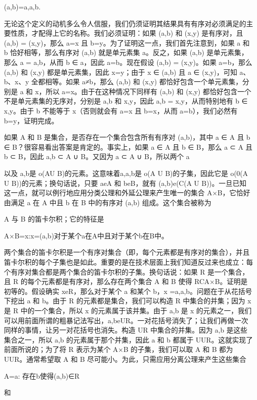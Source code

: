 \documentclass[12pt,a4paper]{ctexbook}
\theoremstyle{definition}
\theoremstyle{remark}
\begin{document}
(a,b)={{a},{a,b}}.

无论这个定义的动机多么令人信服，我们仍须证明其结果具有有序对必须满足的主要性质，才配得上它的名称。我们必须证明：如果 (a,b) 和 (x,y) 是有序对，且 (a,b) = (x,y)，那么 a=x 且 b=y。为了证明这一点，我们首先注意到，如果 a 和 b 恰好相等，那么有序对 (a,b) 就是单元素集 {{a}}。反之，如果 (a,b) 是单元素集，那么 {a} = {a,b}，从而 b ∈ {a}，因此 a=b。现在假设 (a,b) = (x,y)。如果 a=b，那么 (a,b) 和 (x,y) 都是单元素集，因此 x=y；由于 {x} ∈ (a,b) 且 {a} ∈ (x,y)，可知 a、b、x、y 全都相等。如果 a≠b，那么 (a,b) 和 (x,y) 都恰好包含一个单元素集，分别是 {a} 和 {x}，所以 a=x。由于在这种情况下同样有 (a,b) 和 (x,y) 都恰好包含一个不是单元素集的无序对，分别是 {a,b} 和 {x,y}，因此 {a,b} = {x,y}，从而特别地有 b ∈ {x,y}。由于 b 不能等于 x（否则就会有 a=x 且 b=x，从而 a=b），我们必然有 b=y，证明完成。

如果 A 和 B 是集合，是否存在一个集合包含所有有序对 (a,b)，其中 a ∈ A 且 b ∈ B？很容易看出答案是肯定的。事实上，如果 a ∈ A 且 b ∈ B，那么 {a} ⊂ A 且 {b} ⊂ B，因此 {a,b} ⊂ A ∪ B。又因为 {a} ⊂ A ∪ B，所以两个 {a}

以及 {a,b}是 o(AU B)的元素。这意味着{{a},{a,b}}是 o(A U B)的子集，因此它是 o(0(A U B))的元素；换句话说，只要 aeA 和 beB，就有 (a,b)e(C(A U B))。一旦已知这一点，就可以例行地应用分类公理和外延公理来产生唯一的集合 A×B，它恰好由满足 a 在 A 中且 b 在 B 中的有序对 (a,b) 组成。这个集合被称为

A 与 B 的笛卡尔积；它的特征是

A×B={x:x=(a,b)对于某个a在A中且对于某个b在B中}。

两个集合的笛卡尔积是一个有序对集合（即，每个元素都是有序对的集合），并且笛卡尔积的每个子集也是如此。重要的是在技术层面上我们知道反过来也成立：每个有序对集合都是两个集合的笛卡尔积的子集。换句话说：如果 R 是一个集合，且 R 的每个元素都是有序对，那么存在两个集合 A 和 B 使得 RCA×B。证明是初等的。假设确实 xeR，那么对于某个 a 和某个 b，x ={{a},{a,b}}。问题在于从花括号下挖出 a 和 b。由于 R 的元素都是集合，我们可以构造 R 中集合的并集；因为 x 是 R 中的一个集合，所以 x 的元素属于该并集。由于 {a,b} 是 x 的元素之一，我们可以用前面所谓的粗暴记法写出，{a,b}eUR。一对花括号消失了；让我们再做一次同样的事情，让另一对花括号也消失。构造 UR 中集合的并集。因为 {a,b} 是这些集合之一，所以 {a,b} 的元素属于那个并集，因此 a 和 b 都属于 UUR。这就实现了前面所说的；为了将 R 表示为某个 A×B 的子集，我们可以取 A 和 B 都为 UUR。通常希望取 A 和 B 尽可能小。为此，只需应用分离公理来产生这些集合

A={a: 存在b使得(a,b)∈R}

和
\end{document}
